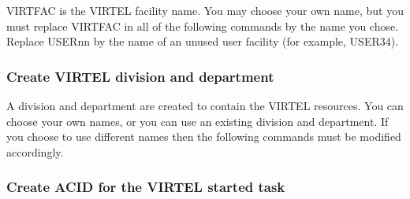 \documentclass[letterpaper,10pt,english]{sphinxmanual}
\begin{document}

VIRTFAC is the VIRTEL facility name. You may choose your own name, but you must replace VIRTFAC in all of the following commands by the name you chose. Replace USERnn by the name of an unused user facility (for example, USER34).


\subsubsection{Create VIRTEL division and department}
\label{\detokenize{Installation_Guide:create-virtel-division-and-department}}
\begin{sphinxVerbatim}[commandchars=\\\{\}]
   
    
\end{sphinxVerbatim}


A division and department are created to contain the VIRTEL resources. You can choose your own names, or you can use an existing division and department. If you choose to use different names then the following commands must be modified accordingly.


\subsubsection{Create ACID for the VIRTEL started task}
\label{\detokenize{Installation_Guide:create-acid-for-the-virtel-started-task}}
\begin{sphinxVerbatim}[commandchars=\\\{\}]
    
           
          
\end{sphinxVerbatim}
\end{document}
